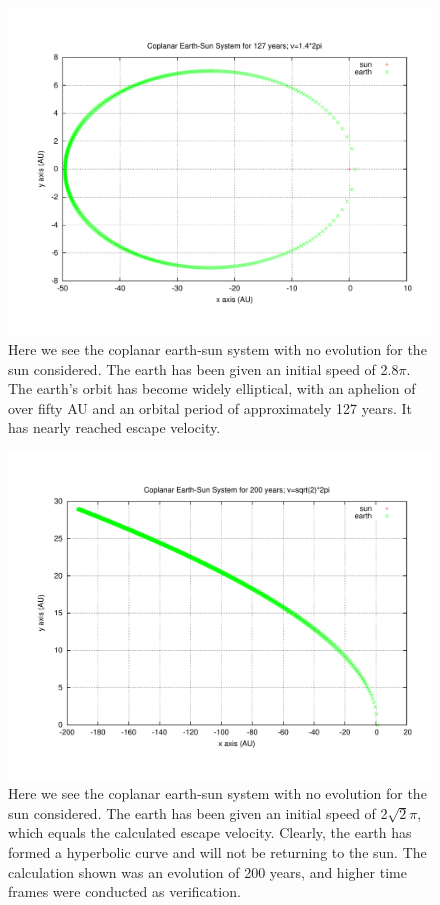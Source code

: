 \documentclass[11pt,a4paper]{article}
\begin{document}
\begin{figure}
\centering
\includegraphics[width=1.0\textwidth]{coplanar_earthsun_v14.pdf}
\caption{Here we see the coplanar earth-sun system with no evolution for the sun considered. The earth has been given an initial speed of 2.8$\pi$. The earth's orbit has become widely elliptical, with an aphelion of over fifty AU and an orbital period of approximately 127 years. It has nearly reached escape velocity.}
\end{figure}
\begin{figure}
\centering
\includegraphics[width=1.0\textwidth]{coplanar_earthsun_vsqrt2.pdf}
\caption{Here we see the coplanar earth-sun system with no evolution for the sun considered. The earth has been given an initial speed of 2$\sqrt{2}\pi$, which equals the calculated escape velocity. Clearly, the earth has formed a hyperbolic curve and will not be returning to the sun. The calculation shown was an evolution of 200 years, and higher time frames were conducted as verification.}
\end{figure}
\end{document}
